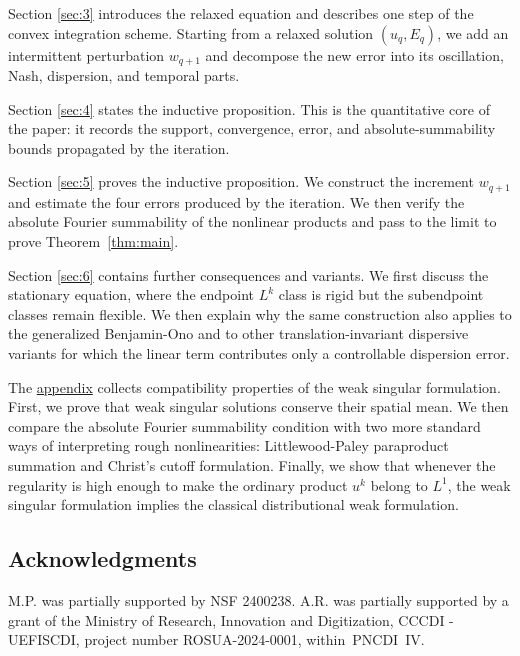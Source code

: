 \documentclass[12pt,reqno,letterpaper]{amsart}
\numberwithin{equation}{section}
\newcommand{\1}{{\bf 1}}
\newcommand{\2}{{\bf 2}}
\theoremstyle{remark}
\theoremstyle{remark}
\begin{document}
Section \ref{sec:3} introduces the relaxed equation and describes one step of the convex integration scheme. Starting from a relaxed solution $(u_q,E_q)$, we add an intermittent perturbation $w_{q+1}$ and decompose the new error into its oscillation, Nash, dispersion, and temporal parts.

Section \ref{sec:4} states the inductive proposition. This is the quantitative core of
the paper: it records the support, convergence, error, and absolute-summability
bounds propagated by the iteration.

Section \ref{sec:5} proves the inductive proposition. We construct the increment $w_{q+1}$ and estimate the four errors produced by the iteration. We then verify the absolute Fourier summability of the nonlinear products and pass to the limit to prove Theorem~\ref{thm:main}.

Section \ref{sec:6} contains further consequences and variants.  We first discuss the stationary equation, where the endpoint $L^k$ class is rigid but the
subendpoint classes remain flexible. We then explain why the same construction
also applies to the generalized Benjamin-Ono and to other translation-invariant
dispersive variants for which the linear term contributes only a controllable
dispersion error.

The \hyperref[sec:appendix]{appendix} collects compatibility properties of the weak singular formulation.
First, we prove that weak singular solutions conserve their spatial mean. We
then compare the absolute Fourier summability condition with two more standard
ways of interpreting rough nonlinearities: Littlewood-Paley paraproduct
summation and Christ's cutoff formulation. Finally, we show that whenever the
regularity is high enough to make the ordinary product $u^k$ belong to $L^1$, the weak singular formulation implies the classical distributional weak formulation.














\subsection{Acknowledgments}
 M.P. was partially supported by NSF 2400238. A.R. was partially supported by a grant of the Ministry of Research, Innovation and Digitization, CCCDI - UEFISCDI, project number ROSUA-2024-0001, within PNCDI IV.
\end{document}
